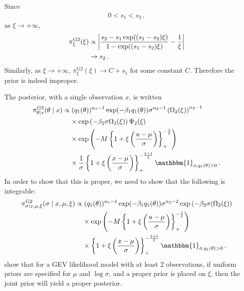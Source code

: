\documentclass{article}
\DeclarePairedDelimiter\abs{\lvert}{\rvert}
\begin{document}
%
Since
%
\begin{align*}
	0 < s_1 < s_2 \,,
\end{align*}
%
as $\xi \to +\infty$,
%
\begin{align*}
	\pi ^ {\text{G2}}_\xi(\xi) &\propto
		\abs*{\frac{s_2 - s_1 \exp((s_1 - s_2) \xi)}
		{1 - \exp((s_1 - s_2) \xi)}
		- \frac{1}{\xi}} \\
	&\to s_2 \,.
\end{align*}
%
Similarly, as $\xi \to +\infty$, $\pi ^ {\text{G2}}_\xi(\xi) \to C + s_1$ for some constant $C$.
Therefore the prior is indeed improper.
%

%
The posterior, with a single observation $x$, is written
%
\begin{align*}
	\pi^{\text{G2}}_{\theta\mid x}(\theta \mid x)
		&\propto (q_{1}(\theta)) ^ {\alpha_1 - 1} \exp(-\beta_1 q_{1}(\theta))
		\sigma ^ {\alpha_2 - 1} \left(\Omega_2(\xi)\right) ^ {\alpha_2 - 1} \\
	&\ \phantom{=} \times \exp\left(-\beta_2 \sigma \Omega_2(\xi)\right)
		\Psi_2(\xi) \\
	&\ \phantom{=} \times \exp \left(-M \left\{1 + \xi
		\left(\frac{u - \mu}{\sigma}\right)\right\}_+ ^ {-\frac{1}{\xi}}\right) \\
	&\ \phantom{=} \times \frac{1}{\sigma}
		\left\{1 + \xi \left(\frac{x - \mu}{\sigma}\right)\right\}_+
		^ {-\frac{\xi + 1}{\xi}}
		\mathbbm{1}_{\sigma, q_1(\theta) > 0} \,.
\end{align*}
%
In order to show that this is proper,
we need to show that the following is integrable:
%
\begin{align*}
	\pi^{\text{G2}}_{\sigma\mid x, \mu, \xi}(\sigma \mid x, \mu, \xi) &\propto
		(q_{1}(\theta)) ^ {\alpha_1 - 1} \exp(-\beta_1 q_{1}(\theta))
		\sigma ^ {\alpha_2 - 2}
		\exp\left(-\beta_2 \sigma (\Omega_2(\xi)\right) \\
	&\ \phantom{=} \times \exp \left(-M \left\{1 + \xi
		\left(\frac{u - \mu}{\sigma}\right)\right\}_+ ^
		{-\frac{1}{\xi}}\right) \\
	&\ \phantom{=} \times
		\left\{1 + \xi \left(\frac{x - \mu}{\sigma}\right)\right\}_+
		^ {-\frac{\xi + 1}{\xi}}
		\mathbbm{1}_{\sigma, q_1(\theta) > 0} \,.
\end{align*}
%
\cite{northrop2016} show that for a GEV likelihood model
with at least 2 observations,
if uniform priors are specified for $\mu$ and $\log \sigma$,
and a proper prior is placed on $\xi$,
then the joint prior will yield a proper posterior.
%
\end{document}
